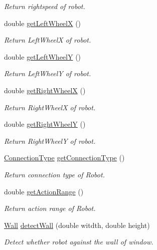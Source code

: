 \begin{DoxyCompactItemize}
\begin{DoxyCompactList}\small\item\em Return rightspeed of robot. \end{DoxyCompactList}\item 
double \hyperlink{classRobotClass_a3fc92ded2588d8e880be8301fe7e78ca}{get\-Left\-Wheel\-X} ()
\begin{DoxyCompactList}\small\item\em Return Left\-Wheel\-X of robot. \end{DoxyCompactList}\item 
double \hyperlink{classRobotClass_ab6d7104d418020f8a1d7254700eead0e}{get\-Left\-Wheel\-Y} ()
\begin{DoxyCompactList}\small\item\em Return Left\-Wheel\-Y of robot. \end{DoxyCompactList}\item 
double \hyperlink{classRobotClass_a5d32eb96cbb3bfe01b956f09e35b925c}{get\-Right\-Wheel\-X} ()
\begin{DoxyCompactList}\small\item\em Return Right\-Wheel\-X of robot. \end{DoxyCompactList}\item 
double \hyperlink{classRobotClass_abc35edf633f6b03a0956e2bdb68a127c}{get\-Right\-Wheel\-Y} ()
\begin{DoxyCompactList}\small\item\em Return Right\-Wheel\-Y of robot. \end{DoxyCompactList}\item 
\hyperlink{Sensor_8h_aa1f0e2efd52935fd01bfece0fbead81f}{Connection\-Type} \hyperlink{classRobotClass_ad1f430d26cf7265285db0742a0fd6f34}{get\-Connection\-Type} ()
\begin{DoxyCompactList}\small\item\em Return connection type of Robot. \end{DoxyCompactList}\item 
double \hyperlink{classRobotClass_a37170c1d224daa872fb4a506719bb43f}{get\-Action\-Range} ()
\begin{DoxyCompactList}\small\item\em Return action range of Robot. \end{DoxyCompactList}\item 
\hyperlink{Shape_8h_ad4f6886266572e51d198a61a6c762ce5}{Wall} \hyperlink{classRobotClass_a3a660d9392490322535d0dda4fa27f27}{detect\-Wall} (double witdth, double height)
\begin{DoxyCompactList}\small\item\em Detect whether robot against the wall of window. \end{DoxyCompactList}\item 

\end{DoxyCompactItemize}
